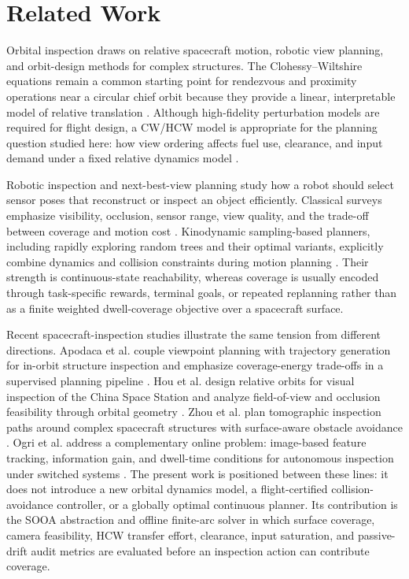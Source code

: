 \section{Related Work}
\label{sec:related}

Orbital inspection draws on relative spacecraft motion, robotic view planning,
and orbit-design methods for complex structures. The Clohessy--Wiltshire
equations remain a common starting point for rendezvous and proximity
operations near a circular chief orbit because they provide a linear,
interpretable model of relative translation \cite{clohessy1960terminal}.
Although high-fidelity perturbation models are required for flight design, a
CW/HCW model is appropriate for the planning question studied here: how view
ordering affects fuel use, clearance, and input demand under a fixed relative
dynamics model \cite{wertz2011space}.

Robotic inspection and next-best-view planning study how a robot should select
sensor poses that reconstruct or inspect an object efficiently. Classical
surveys emphasize visibility, occlusion, sensor range, view quality, and the
trade-off between coverage and motion cost \cite{scott2003view}. Kinodynamic
sampling-based planners, including rapidly exploring random trees and their
optimal variants, explicitly combine dynamics and collision constraints during
motion planning \cite{lavalle1998rapidly,karaman2011sampling}. Their strength
is continuous-state reachability, whereas coverage is usually encoded through
task-specific rewards, terminal goals, or repeated replanning rather than as a
finite weighted dwell-coverage objective over a spacecraft surface.

Recent spacecraft-inspection studies illustrate the same tension from
different directions. Apodaca et al. couple viewpoint planning with trajectory
generation for in-orbit structure inspection and emphasize coverage-energy
trade-offs in a supervised planning pipeline \cite{apodaca2025trajectory}.
Hou et al. design relative orbits for visual inspection of the China Space
Station and analyze field-of-view and occlusion feasibility through orbital
geometry \cite{hou2024relative}. Zhou et al. plan tomographic inspection paths
around complex spacecraft structures with surface-aware obstacle avoidance
\cite{zhou2026tomographic}. Ogri et al. address a complementary online
problem: image-based feature tracking, information gain, and dwell-time
conditions for autonomous inspection under switched systems
\cite{ogri2025switched}. The present work is positioned between these lines:
it does not introduce a new orbital dynamics model, a flight-certified
collision-avoidance controller, or a globally optimal continuous planner.
Its contribution is the SOOA abstraction and offline finite-arc solver in
which surface coverage, camera feasibility, HCW transfer effort, clearance,
input saturation, and passive-drift audit metrics are evaluated before an
inspection action can contribute coverage.

